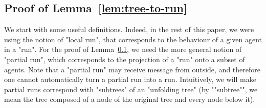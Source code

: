 \subsection{Proof of Lemma~\ref{lem:tree-to-run}}
\label{app:tree-to-run}

\LemTreeToRun*

We start with some useful definitions. Indeed, in the rest of this paper, we were using the notion of "local run", that corresponds to the behaviour of a given agent in a "run". For the proof of Lemma~\ref{app:tree-to-run}, we need the more general notion of "partial run", which corresponds to the projection of a "run" onto a subset of agents. Note that a "partial run" may receive message from outside, and therefore one cannot automatically turn a partial run into a run. Intuitively, we will make partial runs correspond with "subtrees" of an "unfolding tree" (by ""subtree"", we mean the tree composed of a node of the original tree and every node below it). 

